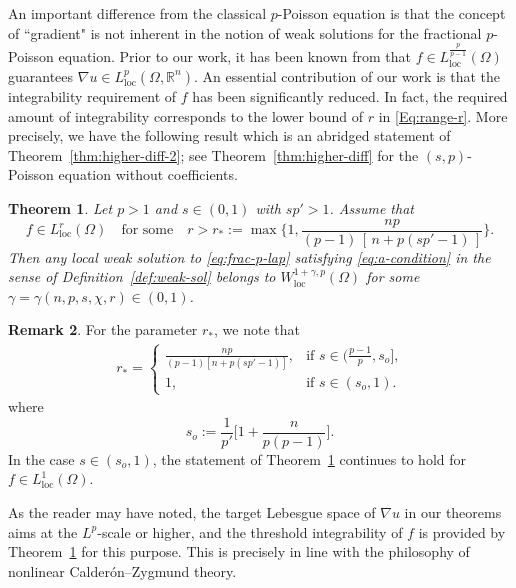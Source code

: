 \documentclass[10pt,letterpaper]{amsart}
\newtheorem{theorem}{Theorem}
\theoremstyle{definition}
\newtheorem{remark}[theorem]{Remark}
\numberwithin{theorem}{section}
\numberwithin{equation}{section}
\newcommand{\R}{\ensuremath{\mathbb{R}}}
\newcommand{\1}{\ensuremath{\mathds{1}}}
\DeclareMathOperator{\loc}{loc}
\numberwithin{equation}{section}
\begin{document}
An important difference from the classical $p$-Poisson equation is that the concept of ``gradient" is not inherent in the notion of weak solutions for the fractional $p$-Poisson equation. Prior to our work, it has been known from \cite{DKLN-higherdiff} that $f\in L^{\frac{p}{p-1}}_{\loc}(\Omega)$ guarantees $\nabla u\in L^{p}_{\loc}(\Omega,\R^n)$. An essential contribution of our work is that the integrability requirement of $f$ has been significantly reduced. In fact, the required amount of integrability corresponds to the lower bound of $r$ in \eqref{Eq:range-r}. More precisely, we have the following result which is an abridged statement of Theorem~\ref{thm:higher-diff-2}; see Theorem~\ref{thm:higher-diff} for the $(s,p)$-Poisson equation without coefficients.


\begin{theorem}\label{Thm:2}
Let $p>1$ and $s\in(0,1)$ with $sp'>1$. Assume that 
\[
f\in L^{r}_{\loc}(\Omega)
\quad \text{for some} \quad
r> r_*:=\max\bigg\{1,\frac{np}{(p-1)\,[\,n+p(sp'-1)\,]}\bigg\}.
\]
Then any local weak solution to \eqref{eq:frac-p-lap} satisfying \eqref{eq:a-condition} 
in the sense of Definition~\ref{def:weak-sol} belongs to $W^{1+\gamma,p}_{\loc}(\Omega)$ 
for some $\gamma=\gamma(n,p,s,\chi,r)\in(0,1)$.
\end{theorem}

\begin{remark}
For the parameter $r_\ast$, we note that 
\begin{align*}%
    r_\ast 
    =\left\{
    \begin{array}{cl}
    \displaystyle
        \frac{np}{(p-1)[n+p(sp'-1)]}, & \mbox{if $\displaystyle s\in(\tfrac{p-1}{p},s_o]$,}\\[12pt]
        1, &  \mbox{if $\displaystyle s\in(s_o,1)$.}
    \end{array}
    \right.
\end{align*}
where 
\begin{equation*}%
    s_o:=\frac{1}{p'}\bigg[1+\frac{n}{p(p-1)}\bigg].
\end{equation*}
In the case $s\in(s_o,1)$, the statement of Theorem~\ref{Thm:2} continues to hold for $f\in L^{1}_{\loc}(\Omega)$. 
\end{remark}

As the reader may have noted, the target Lebesgue space of $\nabla u$ in our theorems aims at the $L^p$-scale or higher, and the threshold integrability of $f$ is provided by Theorem~\ref{Thm:2} for this purpose. 
This is precisely in line with the philosophy of nonlinear Calder\'on–Zygmund theory.
\end{document}
